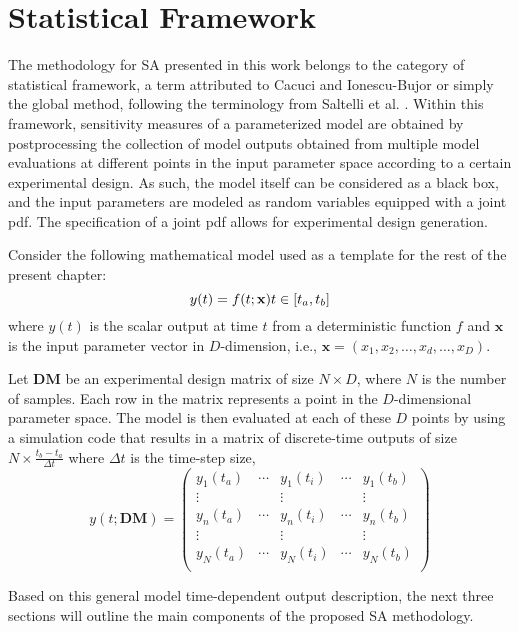\section{Statistical Framework}\label{sec:sa_statistical_framework}

The methodology for SA presented in this work belongs to
the category of statistical framework, a term attributed
to Cacuci and Ionescu-Bujor \cite{Ionescu-Bujor2004} or simply the global
method, following the terminology from Saltelli et al. \cite{Saltelli2004}.
Within this framework, sensitivity measures of a parameterized
model are obtained by postprocessing the collection
of model outputs obtained from multiple model
evaluations at different points in the input parameter space
according to a certain experimental design. 
As such, the model itself can be considered as a black box, 
and the input parameters are modeled as random variables
equipped with a joint pdf. 
The specification of a joint pdf allows for experimental design generation.

Consider the following mathematical model used as a template for the rest of the present chapter:
\begin{equation}
y(t) = f(t;\mathbf{x}) \bigskip t \in [t_a,t_b]
\end{equation}
where $y(t)$ is the scalar output at time $t$ from a deterministic
function $f$ and $\mathbf{x}$ is the input parameter vector in
$D$-dimension, i.e., $\mathbf{x} = (x_1, x_2, \dots , x_d, \dots , x_D)$.

Let $\mathbf{DM}$ be an experimental design matrix of size
$N \times D$, where $N$ is the number of samples. 
Each row in the matrix represents a point in the $D$-dimensional parameter space. 
The model is then evaluated at each of these $D$ points by using a simulation code that results in a matrix of discrete-time outputs of size $N\times \frac{t_b-t_a}{\Delta t}$ where $\Delta t$ is the time-step size,
\begin{equation}
y(t; \mathbf{DM}) = 
\begin{pmatrix}
y_1(t_a)  & \cdots & y_1(t_i) & \cdots & y_1(t_b)\\
\vdots	  &        & \vdots   &        & \vdots\\
y_n(t_a)  & \cdots & y_n(t_i) & \cdots & y_n(t_b)\\
\vdots	  &        & \vdots   &        & \vdots\\
y_N(t_a)  & \cdots & y_N(t_i) & \cdots & y_N(t_b) \\
\end{pmatrix}
\end{equation}

Based on this general model time-dependent output description, 
the next three sections will outline the main components of the proposed SA methodology.
